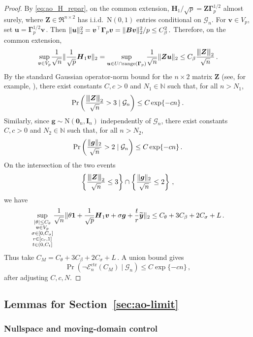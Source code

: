 \documentclass{article}
\makeatletter
\theoremstyle{definition}
\newcommand{\vnorm}[1]{%
	\ensuremath{%
		\if@display
		\left\| #1 \right\|
		\else
		\| #1 \|
		\fi
	}%
}
\newcommand{\abs}[1]{%
	\ensuremath{%
		\if@display
		\left| #1 \right|
		\else
		\lvert #1 \rvert
		\fi
	}%
}
\newcommand{\mnorm}[1]{{\left\vert\kern-0.25ex\left\vert\kern-0.25ex\left\vert #1
		\right\vert\kern-0.25ex\right\vert\kern-0.25ex\right\vert}}
\newcommand*{\bb}{\boldsymbol}
\def\bH {\bb{H}}
\def\bu{\bb{u}}
\def\bv{\bb{v}}
\def\bg{\bb{g}}
\def\bYtil{\widetilde{\bb{y}}}
\def\bH{\bb{H}}
\newcommand{\range}{\operatorname{range}}
\makeatother
\begin{document}
\begin{bibunit}
\begin{proof}
	By \eqref{eq:ao_H_repar}, on the common extension,
	$\bH_1/\sqrt p=\bb Z\bb\Gamma_p^{1/2}$ almost surely, where
	$\bb Z\in\Re^{n\times2}$ has i.i.d.\ $\mathrm N(0,1)$ entries
	conditional on $\mathcal G_n$. For $\bv\in V_p$, set
	$\bu=\bb\Gamma_p^{1/2}\bv\,.$
		Then $\vnorm{\bu}_2^2 = \bv^\top\bb\Gamma_p\bv = \vnorm{\bb B\bv}_2^2/p \leq C_\beta^2\,.$
	Therefore, on the common extension,
	$$
		\underset{\bv\in V_p}{\sup}
		\frac1{\sqrt n}
		\vnorm{
			\frac1{\sqrt p}\bH_1\bv
		}_2
		=
		\underset{\bu\in U\cap\range(\bb\Gamma_p)}{\sup}
		\frac1{\sqrt n}
		\vnorm{\bb Z\bu}_2
		\leq
		C_\beta\frac{\mnorm{\bb Z}_2}{\sqrt n}\,.
	$$
	By the standard Gaussian operator-norm bound for the $n\times2$ matrix $\bb Z$
	(see, for example, \citealt[][Theorem~2.6]{rudelson+vershynin:2010}),
	there exist constants $C,c>0$ and $N_1\in\mathbb N$ such that, for all $n>N_1$,
	$$
		\Pr\left(
			\frac{\mnorm{\bb Z}_2}{\sqrt n}>3
			\mid
			\mathcal G_n
		\right)
		\leq
		C\exp\{-cn\}\,.
	$$
	Similarly, since $\bg\sim\mathrm N(\bb0_n,\bb I_n)$ independently of $\mathcal G_n$, there exist constants $C,c>0$ and $N_2\in\mathbb N$ such that, for all $n>N_2$,
	$$
		\Pr\left(
			\frac{\vnorm{\bg}_2}{\sqrt n}>2
			\mid
			\mathcal G_n
		\right)
		\leq
		C\exp\{-cn\}\,.
	$$
	On the intersection of the two events
	$$
		\left\{
			\frac{\mnorm{\bb Z}_2}{\sqrt n}\leq 3
		\right\}
		\cap
		\left\{
			\frac{\vnorm{\bg}_2}{\sqrt n}\leq 2
		\right\}\,,
	$$
	we have
	$$
		\underset{\substack{
			\abs{\theta}\leq C_\theta\\
			\bv\in V_p\\
			\sigma\in[0,C_\sigma]\\
			r\in[c_r,1]\\
			t\in(0,C_t]
		}}{\sup}
		\frac1{\sqrt n}
		\vnorm{
			\theta\bb1
			+
			\frac1{\sqrt p}\bH_1\bv
			+
			\sigma\bg
			+
			\frac tr\bYtil
		}_2
		\leq
		C_\theta+3C_\beta+2C_\sigma+L\,.
	$$
	Thus take $C_M=C_\theta+3C_\beta+2C_\sigma+L\,.$
	A union bound gives
	$$
		\Pr\left(
			\lnot\mathcal E_n^{\mathrm{ctr}}(C_M)
			\mid
			\mathcal G_n
		\right)
		\leq
		C\exp\{-cn\}\,,
	$$
	after adjusting $C,c,N$.
\end{proof}

\subsection{Lemmas for Section~\ref{sec:ao-limit}}

\subsubsection{Nullspace and moving-domain control}
\label{sec:nullspace-moving-domains}


\end{bibunit}
\end{document}
